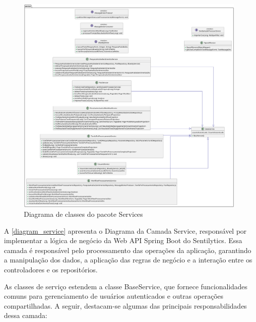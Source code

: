 \documentclass[
	12pt,				%
	oneside,			%
	a4paper,			%
	english,			%
	french,				%
	spanish,			%
	brazil				%
	]{abntex2}
\begin{document}
\begin{figure}[htbp]
\hypertarget{diagram_service}{%
\caption{Diagrama de classes do pacote Services}\label{diagram_service}
\begin{center}
\includegraphics[scale=0.23]{imagens/sentilytics/diagramas/classes/service-classes.png}
\end{center}
}
\end{figure}

A \autoref{diagram_service} apresenta o Diagrama da Camada Service,
responsável por implementar a lógica de negócio da Web API Spring Boot
do Sentilytics. Essa camada é responsável pelo processamento das
operações da aplicação, garantindo a manipulação dos dados, a aplicação
das regras de negócio e a interação entre os controladores e os
repositórios.

As classes de serviço estendem a classe BaseService, que fornece
funcionalidades comuns para gerenciamento de usuários autenticados e
outras operações compartilhadas. A seguir, destacam-se algumas das
principais responsabilidades dessa camada:
\end{document}
